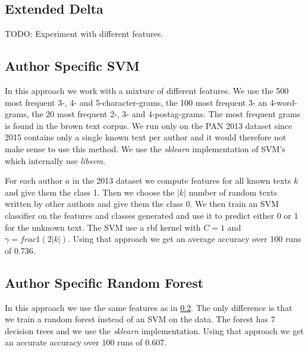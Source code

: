 \subsection{Extended Delta}
TODO: Experiment with different features.

\subsection{Author Specific SVM} \label{subsec:author_specific_svm}
In this approach we work with a mixture of different features. We use the 500
most frequent 3-, 4- and 5-character-grams, the 100 most frequent 3- an
4-word-grams, the 20 most frequent 2-, 3- and 4-postag-grams. The most frequent
grams is found in the brown text corpus. We run only on the PAN 2013 dataset
since 2015 contains only a single known text per author and it would therefore
not make sense to use this method. We use the \textit{sklearn} implementation of
\gls{SVM}'s which internally use \textit{libsvm}.

For each author $a$ in the 2013 dataset we compute features for all known texts
$k$ and give them the class 1. Then we choose the $|k|$ number of random texts
written by other authors and give them the class 0. We then train an \gls{SVM}
classifier on the features and classes generated and use it to predict either 0
or 1 for the unknown text. The \gls{SVM} use a rbf kernel with $C=1$ and
$\gamma = frac{1}{(2|k|)}$. Using that approach we get an average accuracy over
100 runs of 0.736.

\subsection{Author Specific Random Forest}
In this approach we use the same features as in
\ref{subsec:author_specific_svm}. The only difference is that we train a random
forest instead of an \gls{SVM} on the data. The forest has 7 decision trees and
we use the \textit{sklearn} implementation. Using that approach we get an
accurate accuracy over 100 runs of 0.607.
